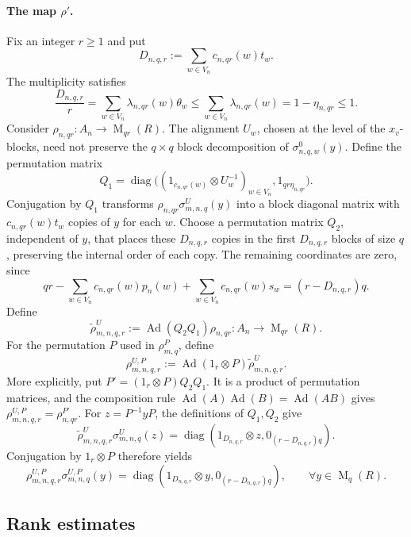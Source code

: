 \documentclass[11pt]{amsart}
\DeclareMathOperator{\Mat}{M}
\DeclareMathOperator{\diag}{diag}
\DeclareMathOperator{\Ad}{Ad}
\theoremstyle{definition}
\theoremstyle{remark}
\begin{document}
\paragraph{\textbf{The map $\rho'$.}}
Fix an integer $r\geq1$ and put
\begin{equation}\label{eq:return-multiplicity}
 D_{n,q,r}:=\sum_{w\in V_n}c_{n,qr}(w)t_w.
\end{equation}
The multiplicity satisfies
\[
 \frac{D_{n,q,r}}r
 =\sum_{w\in V_n}\lambda_{n,qr}(w)\theta_w
 \leq\sum_{w\in V_n}\lambda_{n,qr}(w)
 =1-\eta_{n,qr}\leq1.
\]
Consider $\rho_{n,qr}\colon A_n\to\Mat_{qr}(R)$.
The alignment $U_w$, chosen at the level of the $x_v$-blocks, need not preserve
the $q\times q$ block decomposition of $\sigma_{n,q,w}^0(y)$.
Define the permutation matrix
\[
 Q_1=\diag\bigl((1_{c_{n,qr}(w)}\otimes U_w^{-1})_{w\in V_n},
                  1_{qr\eta_{n,qr}}\bigr).
\]
Conjugation by $Q_1$ transforms
$\rho_{n,qr}\sigma_{m,n,q}^{U}(y)$ into a block diagonal matrix with
$c_{n,qr}(w)t_w$ copies of $y$ for each $w$.
Choose a permutation matrix $Q_2$, independent of $y$, that places these
$D_{n,q,r}$ copies in the first $D_{n,q,r}$ blocks of size $q$,
preserving the internal order of each copy.  The remaining coordinates are zero,
since
\[
 qr-\sum_{w\in V_n}c_{n,qr}(w)p_n(w)
 +\sum_{w\in V_n}c_{n,qr}(w)s_w
 =(r-D_{n,q,r})q.
\]
Define
\[
 \widetilde\rho_{m,n,q,r}^{U}
 :=\Ad(Q_2Q_1)\rho_{n,qr}
 \colon A_n\longrightarrow\Mat_{qr}(R).
\]
For the permutation $P$ used in $\rho_{m,q}^{P}$, define
\begin{equation}\label{eq:return-map}
 \rho_{m,n,q,r}^{U,P}
 :=\Ad(1_r\otimes P)\widetilde\rho_{m,n,q,r}^{U}.
\end{equation}
More explicitly, put $P'=(1_r\otimes P)Q_2Q_1$.
It is a product of permutation matrices, and the composition rule
$\Ad(A)\Ad(B)=\Ad(AB)$ gives
$\rho_{m,n,q,r}^{U,P}=\rho_{n,qr}^{P'}$.
For $z=P^{-1}yP$, the definitions of $Q_1,Q_2$ give
\[
 \widetilde\rho_{m,n,q,r}^{U}\sigma_{m,n,q}^{U}(z)
 =\diag(1_{D_{n,q,r}}\otimes z,0_{(r-D_{n,q,r})q}).
\]
Conjugation by $1_r\otimes P$ therefore yields
\begin{equation}\label{eq:return-map-composition}
 \rho_{m,n,q,r}^{U,P}\sigma_{m,n,q}^{U,P}(y)
 =\diag(1_{D_{n,q,r}}\otimes y,0_{(r-D_{n,q,r})q}),
 \qquad \forall y\in\Mat_q(R).
\end{equation}

\subsection{Rank estimates}
\end{document}
